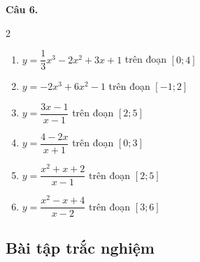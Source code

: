 \documentclass[12pt]{article}
\begin{document}
	\begin{btdo}
		\textbf{Câu 6.}
		\begin{multicols}{2}
			\begin{enumerate}[label=\alph*)]
				\item $y = \dfrac{1}{3}x^3 - 2x^2 + 3x + 1$ trên đoạn $[0; 4]$
				\item $y = -2x^3 + 6x^2 - 1$ trên đoạn $[-1; 2]$
				\item $y = \dfrac{3x - 1}{x - 1}$ trên đoạn $[2; 5]$
				\item $y = \dfrac{4 - 2x}{x + 1}$ trên đoạn $[0; 3]$
				\item $y = \dfrac{x^2 + x + 2}{x - 1}$ trên đoạn $[2; 5]$
				\item $y = \dfrac{x^2 - x + 4}{x - 2}$ trên đoạn $[3; 6]$
			\end{enumerate}
		\end{multicols}
	\end{btdo}
	
	
	
	
	\subsection{Bài tập trắc nghiệm}
	
\end{document}
